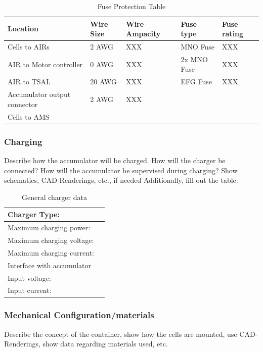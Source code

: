 \begin{table}[H]
	\centering
	\caption{Fuse Protection Table}
	\begin{tabularx}{\textwidth}{|X|X|X|X|X|}
		\hline
		Location & Wire Size & Wire Ampacity & Fuse type & Fuse rating\\[\TableSize]
		\hline
		Cells to AIRs & 2 AWG & XXX & MNO Fuse & XXX \\[\TableSize]
		\hline
		AIR to Motor controller & 0 AWG & XXX & 2x MNO Fuse & XXX \\[\TableSize]
		\hline
		AIR to TSAL & 20 AWG & XXX & EFG Fuse & XXX \\[\TableSize]
		\hline
		Accumulator output connector & 2 AWG & XXX &     &  \\[\TableSize]
		\hline
		Cells to AMS &     &     &     &  \\[\TableSize]
		\hline
	\end{tabularx}%
	\label{tab:acc-fuse-protection}%
\end{table}%

\subsubsection{Charging}
Describe how the accumulator will be charged. How will the charger be connected? How will the accumulator be supervised during charging? Show schematics, CAD-Renderings, etc., if needed
Additionally, fill out the table:

\begin{table}[H]
	\centering
	\caption{General charger data}
	\begin{tabularx}{\textwidth}{|X|X|}
		\hline
		Charger Type: & \\[\TableSize]
		\hline
		Maximum charging power: &\\[\TableSize]
		\hline
		Maximum charging voltage: &  \\[\TableSize]
		\hline
		Maximum charging current: &  \\[\TableSize]
		\hline
		Interface with accumulator &  \\[\TableSize]
		\hline
		Input voltage: & \\[\TableSize]
		\hline
		Input current: &  \\[\TableSize]
		\hline
	\end{tabularx}%
	\label{tab:acc-charger}%
\end{table}%

\subsubsection{Mechanical Configuration/materials}
Describe the concept of the container, show how the cells are mounted, use CAD-Renderings, show data regarding materials used, etc.

